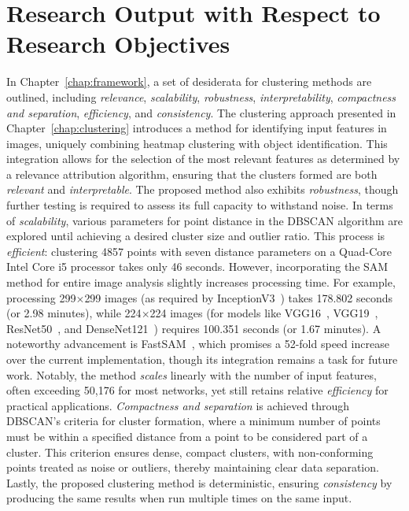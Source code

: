\section{Research Output with Respect to Research Objectives}
In Chapter~\ref{chap:framework}, a set of desiderata for clustering methods are outlined, including \emph{relevance}, \emph{scalability}, \emph{robustness}, \emph{interpretability}, \emph{compactness and separation}, \emph{efficiency}, and \emph{consistency}. The clustering approach presented in Chapter~\ref{chap:clustering} introduces a method for identifying input features in images, uniquely combining heatmap clustering with object identification. This integration allows for the selection of the most relevant features as determined by a relevance attribution algorithm, ensuring that the clusters formed are both \emph{relevant} and \emph{interpretable}. The proposed method also exhibits \emph{robustness}, though further testing is required to assess its full capacity to withstand noise. In terms of \emph{scalability}, various parameters for point distance in the DBSCAN algorithm are explored until achieving a desired cluster size and outlier ratio. This process is \emph{efficient}: clustering 4857 points with seven distance parameters on a Quad-Core Intel Core i5 processor takes only 46 seconds. However, incorporating the SAM method for entire image analysis slightly increases processing time. For example, processing 299$\times$299 images (as required by InceptionV3~\cite{szegedy2015rethinking}) takes 178.802 seconds (or 2.98 minutes), while 224$\times$224 images (for models like VGG16~\cite{SimonyanZ14a}, VGG19~\cite{SimonyanZ14a}, ResNet50~\cite{he2015deep}, and DenseNet121~\cite{huang2018densely}) requires 100.351 seconds (or 1.67 minutes). A noteworthy advancement is FastSAM~\cite{abs-2306-12156}, which promises a 52-fold speed increase over the current implementation, though its integration remains a task for future work. Notably, the method \emph{scales} linearly with the number of input features, often exceeding 50,176 for most networks, yet still retains relative \emph{efficiency} for practical applications. \emph{Compactness and separation} is achieved through DBSCAN's criteria for cluster formation, where a minimum number of points must be within a specified distance from a point to be considered part of a cluster. This criterion ensures dense, compact clusters, with non-conforming points treated as noise or outliers, thereby maintaining clear data separation. Lastly, the proposed clustering method is deterministic, ensuring \emph{consistency} by producing the same results when run multiple times on the same input.

